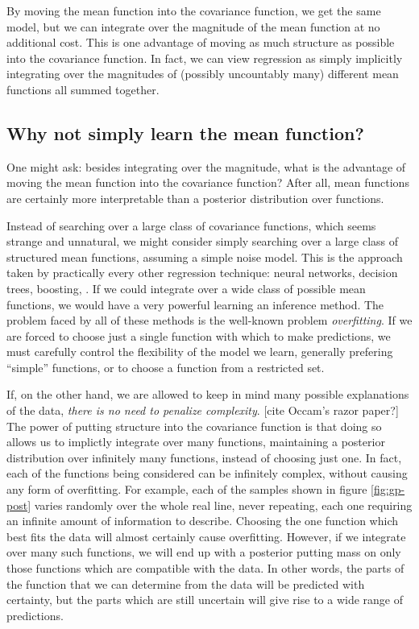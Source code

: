 By moving the mean function into the covariance function, we get the same model, but we can integrate over the magnitude of the mean function at no additional cost.
This is one advantage of moving as much structure as possible into the covariance function.
In fact, we can view \gp{} regression as simply implicitly integrating over the magnitudes of (possibly uncountably many) different mean functions all summed together.

\subsection{Why not simply learn the mean function?}
One might ask: besides integrating over the magnitude, what is the advantage of moving the mean function into the covariance function?
After all, mean functions are certainly more interpretable than a posterior distribution over functions.

Instead of searching over a large class of covariance functions, which seems strange and unnatural, we might consider simply searching over a large class of structured mean functions, assuming a simple \iid noise model.
This is the approach taken by practically every other regression technique: neural networks, decision trees, boosting, \etc.
If we could integrate over a wide class of possible mean functions, we would have a very powerful learning an inference method.
The problem faced by all of these methods is the well-known problem \emph{overfitting}.
If we are forced to choose just a single function with which to make predictions, we must carefully control the flexibility of the model we learn, generally prefering ``simple'' functions, or to choose a function from a restricted set.

If, on the other hand, we are allowed to keep in mind many possible explanations of the data, \emph{there is no need to penalize complexity}. [cite Occam's razor paper?]
The power of putting structure into the covariance function is that doing so allows us to implictly integrate over many functions, maintaining a posterior distribution over infinitely many functions, instead of choosing just one.
In fact, each of the functions being considered can be infinitely complex, without causing any form of overfitting.
For example, each of the samples shown in figure \ref{fig:gp-post} varies randomly over the whole real line, never repeating, each one requiring an infinite amount of information to describe.
Choosing the one function which best fits the data will almost certainly cause overfitting.
However, if we integrate over many such functions, we will end up with a posterior putting mass on only those functions which are compatible with the data.
In other words, the parts of the function that we can determine from the data will be predicted with certainty, but the parts which are still uncertain will give rise to a wide range of predictions.


